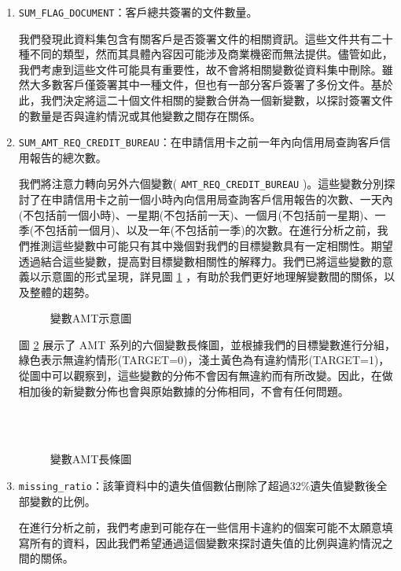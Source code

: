 \documentclass[12pt, a4paper]{article}
\begin{document}
\begin{enumerate}
\item \verb|SUM_FLAG_DOCUMENT|：客戶總共簽署的文件數量。

我們發現此資料集包含有關客戶是否簽署文件的相關資訊。這些文件共有二十種不同的類型，然而其具體內容因可能涉及商業機密而無法提供。儘管如此，我們考慮到這些文件可能具有重要性，故不會將相關變數從資料集中刪除。雖然大多數客戶僅簽署其中一種文件，但也有一部分客戶簽署了多份文件。基於此，我們決定將這二十個文件相關的變數合併為一個新變數，以探討簽署文件的數量是否與違約情況或其他變數之間存在關係。

\item \verb|SUM_AMT_REQ_CREDIT_BUREAU|：在申請信用卡之前一年內向信用局查詢客戶信用報告的總次數。

我們將注意力轉向另外六個變數( \verb|AMT_REQ_CREDIT_BUREAU| )。這些變數分別探討了在申請信用卡之前一個小時內向信用局查詢客戶信用報告的次數、一天內(不包括前一個小時)、一星期(不包括前一天)、一個月(不包括前一星期)、一季(不包括前一個月)、以及一年(不包括前一季)的次數。在進行分析之前，我們推測這些變數中可能只有其中幾個對我們的目標變數具有一定相關性。期望透過結合這些變數，提高對目標變數相關性的解釋力。我們已將這些變數的意義以示意圖的形式呈現，詳見圖 \ref{fig:變數AMT示意圖} ，有助於我們更好地理解變數間的關係，以及整體的趨勢。

\begin{figure}[h]
    \caption{變數AMT示意圖}
    \label{fig:變數AMT示意圖}
\end{figure}

圖 \ref{fig:AMT} 展示了 AMT 系列的六個變數長條圖，並根據我們的目標變數進行分組，綠色表示無違約情形(TARGET=0)，淺土黃色為有違約情形(TARGET=1)，從圖中可以觀察到，這些變數的分佈不會因有無違約而有所改變。因此，在做相加後的新變數分佈也會與原始數據的分佈相同，不會有任何問題。

\begin{figure} [h]
    \centering
    \hspace{1cm} 
    \hspace{1cm} \\
\hspace{1cm}
\hspace{1cm}\\
\hspace{1cm}
    \caption{變數AMT長條圖}\label{fig:AMT}
\end{figure}

\item \verb|missing_ratio|：該筆資料中的遺失值個數佔刪除了超過32\%遺失值變數後全部變數的比例。

在進行分析之前，我們考慮到可能存在一些信用卡違約的個案可能不太願意填寫所有的資料，因此我們希望通過這個變數來探討遺失值的比例與違約情況之間的關係。

\end{enumerate}
\end{document}
